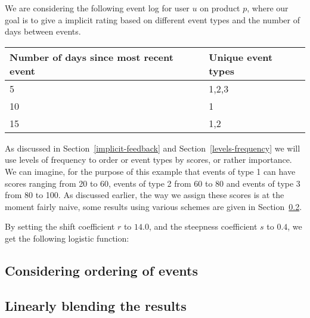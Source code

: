 We are considering the following event log for user $u$ on product $p$, where
our goal is to give a implicit rating based on different event types and the
number of days between events.

\begin{table}[h!]
  \begin{tabular}{p{4cm}m{3cm}}
    \toprule
    Number of days since most recent event & Unique event types \\
    \midrule
    5 & 1,2,3 \\
    10 & 1 \\
    15 & 1,2 \\
    \bottomrule
  \end{tabular}
\end{table}

As discussed in Section~\ref{implicit-feedback} and
Section~\ref{levels-frequency} we will use levels of frequency to order or
event types by scores, or rather importance. We can imagine, for the purpose of
this example that events of type 1 can have scores ranging from 20 to 60,
events of type 2 from 60 to 80 and events of type 3 from 80 to 100. As
discussed earlier, the way we assign these scores is at the moment fairly
naive, some results using various schemes are given in Section~\ref{}. 

By setting the shift coefficient $r$ to $14.0$, and the steepness coefficient
$s$ to $0.4$, we get the following logistic function:

\begin{figure}[h!]
  \centering
\end{figure}


\subsection{Considering ordering of events}

\subsection{Linearly blending the results}
